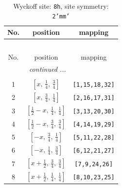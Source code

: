 \documentclass[fleqn,8pt]{jsarticle}
\begin{document}
\begin{longtable}{ccc}
\caption{Wyckoff site: {\tt 8h}, site symmetry: {\tt 2'mm'}}
 \\
 \hline \hline
No. & position & mapping \\ \hline \endfirsthead

\multicolumn{2}{l}{\tablename\ \thetable{}} \\
 \hline \hline
No. & position & mapping \\ \hline \endhead

 \hline \hline
\multicolumn{2}{r}{\footnotesize\it continued ...} \\ \endfoot

 \hline \hline
\multicolumn{2}{r}{} \\ \endlastfoot

1 & $\left[ x,\, \frac{1}{4},\, \frac{3}{4} \right]$ & {\tt [1,15,18,32]} \\ \hline
2 & $\left[ x,\, \frac{3}{4},\, \frac{1}{4} \right]$ & {\tt [2,16,17,31]} \\ \hline
3 & $\left[ \frac{1}{2} - x,\, \frac{1}{4},\, \frac{1}{4} \right]$ & {\tt [3,13,20,30]} \\ \hline
4 & $\left[ \frac{1}{2} - x,\, \frac{3}{4},\, \frac{3}{4} \right]$ & {\tt [4,14,19,29]} \\ \hline
5 & $\left[ - x,\, \frac{3}{4},\, \frac{1}{4} \right]$ & {\tt [5,11,22,28]} \\ \hline
6 & $\left[ - x,\, \frac{1}{4},\, \frac{3}{4} \right]$ & {\tt [6,12,21,27]} \\ \hline
7 & $\left[ x + \frac{1}{2},\, \frac{3}{4},\, \frac{3}{4} \right]$ & {\tt [7,9,24,26]} \\ \hline
8 & $\left[ x + \frac{1}{2},\, \frac{1}{4},\, \frac{1}{4} \right]$ & {\tt [8,10,23,25]} \\
\end{longtable}
\renewcommand{\arraystretch}{1.2}
\end{document}
